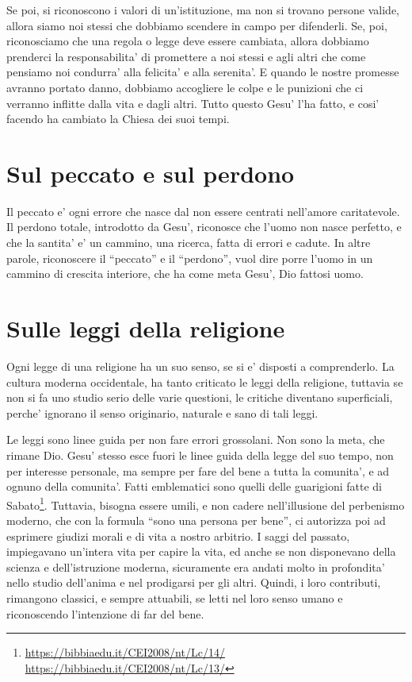 Se poi, si riconoscono i valori di un'istituzione, ma non si trovano persone valide, allora siamo noi stessi che dobbiamo scendere in campo per difenderli. Se, poi, riconosciamo che una regola o legge deve essere cambiata, allora dobbiamo prenderci la responsabilita' di promettere a noi stessi e agli altri che come pensiamo noi condurra' alla felicita' e alla serenita'. E quando le nostre promesse avranno portato danno, dobbiamo accogliere le colpe e le punizioni che ci verranno inflitte dalla vita e dagli altri. Tutto questo Gesu' l'ha fatto, e cosi' facendo ha cambiato la Chiesa dei suoi tempi. 

\section{Sul peccato e sul perdono}

Il peccato e' ogni errore che nasce dal non essere centrati nell'amore caritatevole. Il perdono totale, introdotto da Gesu', riconosce che l'uomo non nasce perfetto, e che la santita' e' un cammino, una ricerca, fatta di errori e cadute. In altre parole, riconoscere il ``peccato'' e il ``perdono'', vuol dire porre l'uomo in un cammino di crescita interiore, che ha come meta Gesu', Dio fattosi uomo.

\section{Sulle leggi della religione}

Ogni legge di una religione ha un suo senso, se si e' disposti a comprenderlo. La cultura moderna occidentale, ha tanto criticato le leggi della religione, tuttavia se non si fa uno studio serio delle varie questioni, le critiche diventano superficiali, perche' ignorano il senso originario, naturale e sano di tali leggi.

Le leggi sono linee guida per non fare errori grossolani. Non sono la meta, che rimane Dio. Gesu' stesso esce fuori le linee guida della legge del suo tempo, non per interesse personale, ma sempre per fare del bene a tutta la comunita', e ad ognuno della comunita'. Fatti emblematici sono quelli delle guarigioni fatte di Sabato\footnote{\url{https://bibbiaedu.it/CEI2008/nt/Lc/14/} \url{https://bibbiaedu.it/CEI2008/nt/Lc/13/}}. Tuttavia, bisogna essere umili, e non cadere nell'illusione del perbenismo moderno, che con la formula ``sono una persona per bene'', ci autorizza poi ad esprimere giudizi morali e di vita a nostro arbitrio. I saggi del passato, impiegavano un'intera vita per capire la vita, ed anche se non disponevano della scienza e dell'istruzione moderna, sicuramente era andati molto in profondita' nello studio dell'anima e nel prodigarsi per gli altri. Quindi, i loro contributi, rimangono classici, e sempre attuabili, se letti nel loro senso umano e riconoscendo l'intenzione di far del bene.

